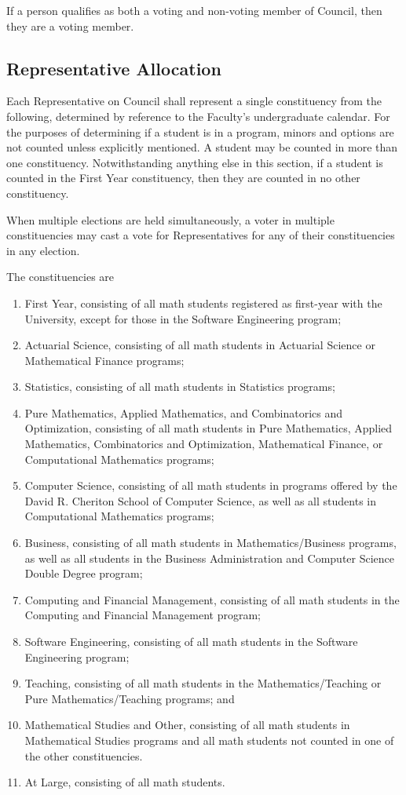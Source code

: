 If a person qualifies as both a voting and non-voting member of Council, then
they are a voting member.

\subsection{Representative Allocation}
Each Representative on Council shall represent a single constituency from the
following, determined by reference to the Faculty's undergraduate calendar. For
the purposes of determining if a student is in a program, minors and options are
not counted unless explicitly mentioned. A student may be
counted in more than one constituency. Notwithstanding anything else in this
section, if a student is counted in the First Year constituency, then they are
counted in no other constituency.

When multiple elections are held simultaneously, a voter in multiple
constituencies may cast a vote for Representatives for any of their constituencies in
any election.

The constituencies are
\begin{enumerate}
  \item First Year, consisting of all math students registered as first-year
    with the University, except for those in the Software Engineering program;
  \item Actuarial Science, consisting of all math students in Actuarial Science
    or Mathematical Finance programs;
  \item Statistics, consisting of all math students in Statistics programs;
  \item Pure Mathematics, Applied Mathematics, and Combinatorics and
    Optimization, consisting of all math students in Pure Mathematics, Applied
    Mathematics, Combinatorics and Optimization, Mathematical Finance, or
    Computational Mathematics programs;
  \item Computer Science, consisting of all math students in programs offered by
    the David R. Cheriton School of Computer Science, as well as all students in
    Computational Mathematics programs;
  \item Business, consisting of all math students in Mathematics/Business
    programs, as well as all students in the Business Administration and
    Computer Science Double Degree program;
  \item Computing and Financial Management, consisting of all math students in
    the Computing and Financial Management program;
  \item Software Engineering, consisting of all math students in the Software
    Engineering program;
  \item Teaching, consisting of all math students in the
    Mathematics/Teaching or Pure Mathematics/Teaching programs;
    and
  \item Mathematical Studies and Other, consisting of all math students in
    Mathematical Studies programs and all math students not counted in one of
    the other constituencies.
  \item At Large, consisting of all math students.  
\end{enumerate}

